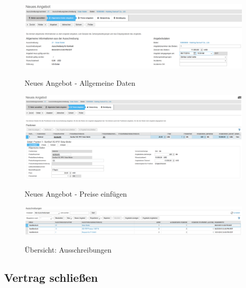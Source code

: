 \begin{figure}[H]
	\begin{center}
	\includegraphics[width=1.0\textwidth]{grafiken/ByDesign-HowTo-Ausschreibung-4.png}
	\caption{Neues Angebot - Allgemeine Daten}
	\vspace{-10pt}
	\label{abb:byd-newsupplier}
	\end{center}
\end{figure}

\begin{figure}[H]
	\begin{center}
	\includegraphics[width=1.0\textwidth]{grafiken/ByDesign-HowTo-Ausschreibung-5.png}
	\caption{Neues Angebot - Preise einfügen}
	\vspace{-10pt}
	\label{abb:byd-newsupplier}
	\end{center}
\end{figure}

\begin{figure}[H]
	\begin{center}
	\includegraphics[width=1.0\textwidth]{grafiken/ByDesign-HowTo-Ausschreibung-6.png}
	\caption{Übersicht: Ausschreibungen}
	\vspace{-10pt}
	\label{abb:byd-newsupplier}
	\end{center}
\end{figure}

\subsection{Vertrag schließen}
\label{contract}

